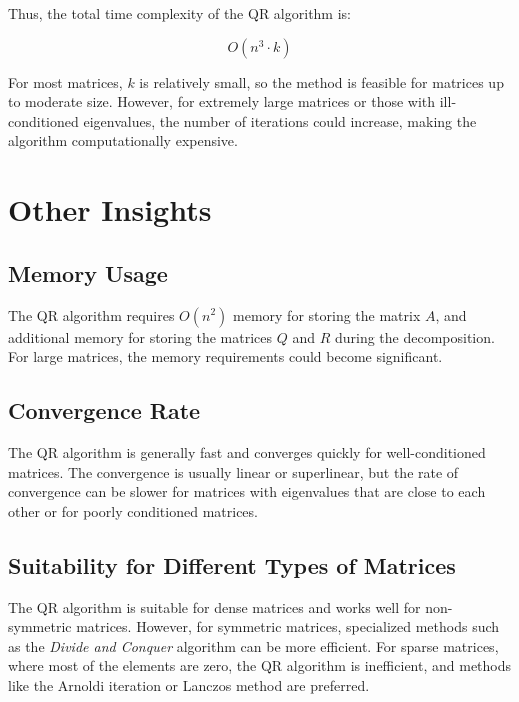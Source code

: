 \documentclass[a4paper,12pt]{report}
\begin{document}
Thus, the total time complexity of the QR algorithm is:

\[
O(n^3 \cdot k)
\]

For most matrices, \( k \) is relatively small, so the method is feasible for matrices up to moderate size. However, for extremely large matrices or those with ill-conditioned eigenvalues, the number of iterations could increase, making the algorithm computationally expensive.

\section*{\textcolor{myblue}{Other Insights}}

\subsection*{\textcolor{mygreen}{Memory Usage}}
The QR algorithm requires \( O(n^2) \) memory for storing the matrix \( A \), and additional memory for storing the matrices \( Q \) and \( R \) during the decomposition. For large matrices, the memory requirements could become significant. 

\subsection*{\textcolor{mygreen}{Convergence Rate}}
The QR algorithm is generally fast and converges quickly for well-conditioned matrices. The convergence is usually linear or superlinear, but the rate of convergence can be slower for matrices with eigenvalues that are close to each other or for poorly conditioned matrices.

\subsection*{\textcolor{mygreen}{Suitability for Different Types of Matrices}}
The QR algorithm is suitable for dense matrices and works well for non-symmetric matrices. However, for symmetric matrices, specialized methods such as the \textit{Divide and Conquer} algorithm can be more efficient. For sparse matrices, where most of the elements are zero, the QR algorithm is inefficient, and methods like the Arnoldi iteration or Lanczos method are preferred.
\end{document}
